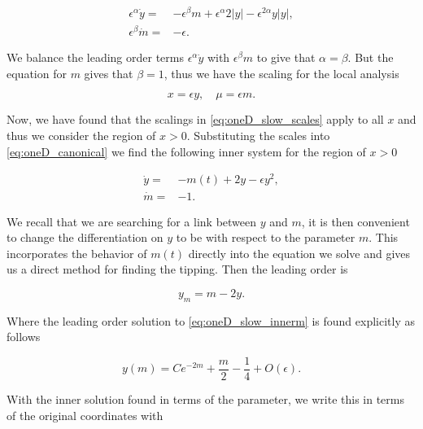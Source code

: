 \begin{equation}\label{eq:oneD_slow_scalesearch}
\begin{aligned}
\epsilon^\alpha \dot{y}=&-\epsilon^\beta m +\epsilon^\alpha 2|y|-\epsilon^{2\alpha}y|y|,\\
 \epsilon^\beta \dot{m}=&-\epsilon.
\end{aligned}
\end{equation}

We balance the leading order terms $\epsilon^\alpha\dot{y}$ with $\epsilon^\beta m$ to give that $\alpha=\beta$. But the equation for $m$ gives that $\beta=1$, thus we have the scaling for the local analysis

\begin{equation}\label{eq:oneD_slow_scales}
x=\epsilon y,\quad \mu=\epsilon m.
\end{equation}

Now, we have found that the scalings in \eqref{eq:oneD_slow_scales} apply to all $x$ and thus we consider the region of $x>0$. Substituting the scales into \eqref{eq:oneD_canonical} we find the following inner system for the region of $x>0$

\begin{equation}\label{eq:oneD_slow_innereq}
\begin{aligned}
\dot{y}=&-m(t)+2 y-\epsilon y^2,\\
\dot{m}=&-1.
\end{aligned}
\end{equation}

We recall that we are searching for a link between $y$ and $m$, it is then convenient to change the differentiation on $y$ to be with respect to the parameter $m$. This incorporates the behavior of $m(t)$ directly into the equation we solve and gives us a direct method for finding the tipping. Then the leading order is

\begin{equation}\label{eq:oneD_slow_innerm}
y_m = m-2y.
\end{equation}

Where the leading order solution to \eqref{eq:oneD_slow_innerm} is found explicitly as follows

\begin{equation*}
y(m) = C e^{-2m}+\frac{m}{2}-\frac{1}{4}+O(\epsilon).
\end{equation*}

With the inner solution found in terms of the parameter, we write this in terms of the original coordinates with

